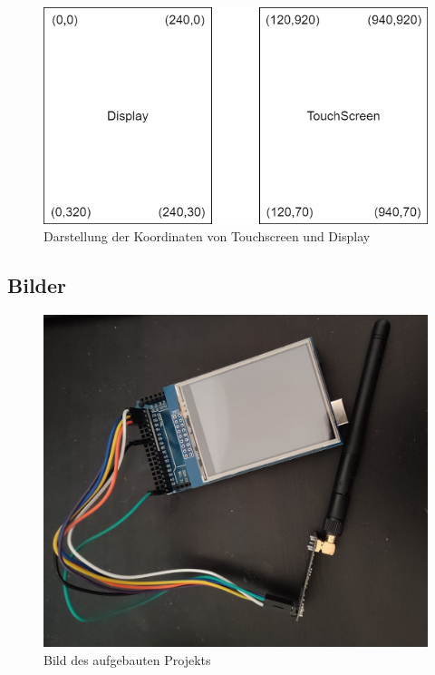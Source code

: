 \documentclass[a4paper, 11pt]{scrartcl}
\begin{document}
\begin{small}
\begin{figure}[H]
    \begin{center}
        \includegraphics[scale=0.5]{Bilder/touch_grafik_koord.png}
        \caption{Darstellung der Koordinaten von Touchscreen und Display}\label{diag:diskrepanz}
    \end{center}
\end{figure}



\subsection{Bilder}\label{ch:pics}
\begin{figure}[H]
    \begin{center}
        \includegraphics[scale=0.15]{Bilder/projekt_fertig.jpeg}
        \caption{Bild des aufgebauten Projekts}\label{pic:project_done}
    \end{center}
\end{figure}



\end{small}
\end{document}
